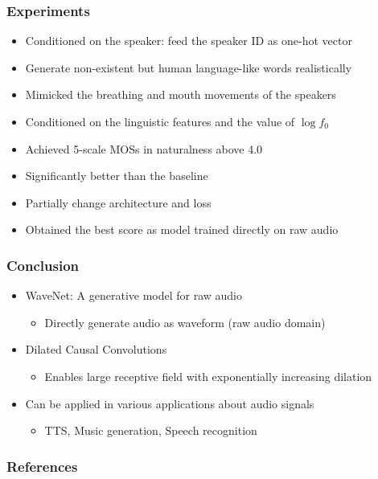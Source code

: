 \documentclass[dvipdfmx]{beamer}
\begin{document}
\begin{frame}
    \frametitle{Experiments}
    \begin{itemize}
        \item Conditioned on the speaker: feed the speaker ID as one-hot vector
        \item Generate non-existent but human language-like words realistically
        \item Mimicked the breathing and mouth movements of the speakers
    \end{itemize}
    \begin{itemize}
        \item Conditioned on the linguistic features and the value of $\log f_0$
        \item Achieved 5-scale MOSs in naturalness above 4.0
        \item Significantly better than the baseline
    \end{itemize}
    \begin{itemize}
        \item Partially change architecture and loss
        \item Obtained the best score as model trained directly on raw audio
    \end{itemize}
\end{frame}


\begin{frame}
    \frametitle{Conclusion}
    \begin{itemize}
        \item WaveNet: A generative model for raw audio
        \begin{itemize}
            \item Directly generate audio as waveform (raw audio domain)
        \end{itemize}
    \end{itemize}
    \begin{itemize}
        \item Dilated Causal Convolutions
        \begin{itemize}
            \item Enables large receptive field with exponentially increasing dilation
        \end{itemize}
    \end{itemize}
    \begin{itemize}
        \item Can be applied in various applications about audio signals
        \begin{itemize}
            \item TTS, Music generation, Speech recognition
        \end{itemize}
    \end{itemize}
\end{frame}


\begin{frame}
    \frametitle{References}
    \beamertemplatetextbibitems
    
    
 \end{frame}
\end{document}
